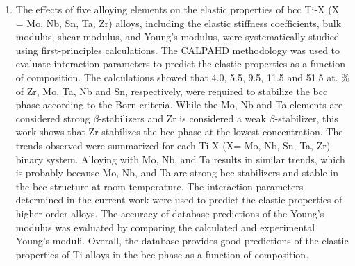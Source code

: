 \begin{enumerate}
	\item The effects of five alloying elements on the elastic properties of bcc Ti-X (X = Mo, Nb, Sn, Ta, Zr) alloys, including the elastic stiffness coefficients, bulk modulus, shear modulus, and Young's modulus, were systematically studied using first-principles calculations. The CALPAHD methodology was used to evaluate interaction parameters to predict the elastic properties as a function of composition. The calculations showed that 4.0, 5.5, 9.5, 11.5 and 51.5 at. \% of Zr, Mo, Ta, Nb and Sn, respectively, were required to stabilize the bcc phase according to the Born criteria. While the Mo, Nb and Ta elements are considered strong $\beta$-stabilizers and Zr is considered a weak $\beta$-stabilizer, this work shows that Zr stabilizes the bcc phase at the lowest concentration. The trends observed were summarized for each Ti-X (X= Mo, Nb, Sn, Ta, Zr) binary system. Alloying with Mo, Nb, and Ta results in similar trends, which is probably because Mo, Nb, and Ta are strong bcc stabilizers and stable in the bcc structure at room temperature. The interaction parameters determined in the current work were used to predict the elastic properties of higher order alloys. The accuracy of database predictions of the Young's modulus was evaluated by comparing the calculated and experimental Young's moduli. Overall, the database provides good predictions of the elastic properties of Ti-alloys in the bcc phase as a function of composition.

\end{enumerate}
